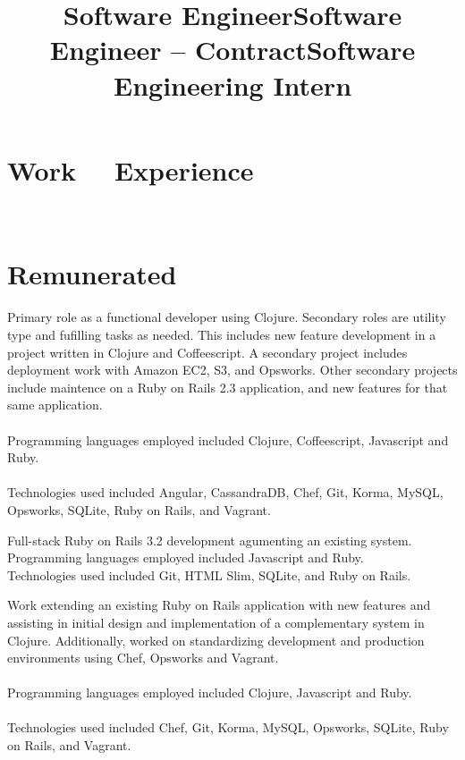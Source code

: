 \documentclass[margintitle,line]{res}
\renewcommand{\subsection}[1]{\section{\normalfont #1}}
\begin{document}
\begin{resume}
\section{Work \ \ Experience}
\ \\
\subsection{Remunerated}

\title{Software Engineer}
\begin{position}
 Primary role as a functional developer using Clojure. Secondary roles are utility type and fufilling tasks as needed. This includes new feature development in a project written in Clojure and Coffeescript. A secondary project includes deployment work with Amazon EC2, S3, and Opsworks. Other secondary projects include maintence on a Ruby on Rails 2.3 application, and new features for that same application. \\ \ \\
 Programming languages employed included Clojure, Coffeescript, Javascript and Ruby. \\ \ \\
 Technologies used included Angular, CassandraDB, Chef, Git, Korma, MySQL, Opsworks, SQLite, Ruby on Rails, and Vagrant.
\end{position}

\title{Software Engineer -- Contract}
\begin{position}
 Full-stack Ruby on Rails 3.2 development agumenting an existing system. \\
 Programming languages employed included Javascript and Ruby. \\
 Technologies used included Git, HTML Slim, SQLite, and Ruby on Rails.
\end{position}

\title{Software Engineering Intern}
\begin{position}
 Work extending an existing Ruby on Rails application with new features and assisting in initial design and implementation of a complementary system in  Clojure. Additionally, worked on standardizing development and production environments using Chef, Opsworks and Vagrant. \\ \ \\
 Programming languages employed included Clojure, Javascript and Ruby. \\ \ \\
 Technologies used included Chef, Git, Korma, MySQL, Opsworks, SQLite, Ruby on Rails, and Vagrant.
\end{position}


\end{resume}
\end{document}
